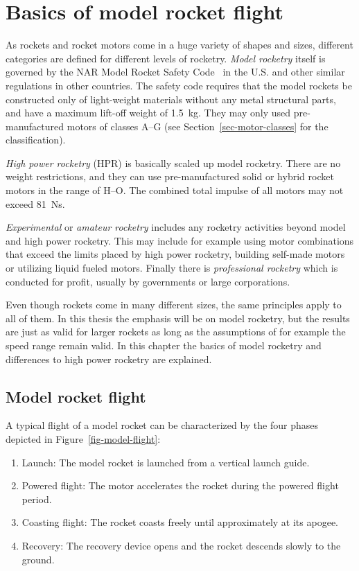 

\chapter{Basics of model rocket flight}
\label{chap-basics}


As rockets and rocket motors come in a huge variety of shapes and
sizes, different categories are defined for different levels of
rocketry.  {\it Model rocketry} itself is governed by the NAR Model
Rocket Safety Code~\cite{nar-safety-code} in the U.S. and other
similar regulations in other countries.  The safety code requires that
the model rockets be constructed only of light-weight materials
without any metal structural parts, and have a maximum lift-off weight
of 1.5~kg.  They may only used pre-manufactured motors of classes A--G
(see Section~\ref{sec-motor-classes} for the classification).

{\it High power rocketry} (HPR) is basically scaled up model
rocketry.  There are no weight restrictions, and they can use
pre-manufactured solid or hybrid rocket motors in the range of H--O.
The combined total impulse of all motors may not exceed 81~Ns.

{\it Experimental} or {\it amateur rocketry} includes any rocketry
activities beyond model and high power rocketry.  This may include
for example using motor combinations that exceed the limits placed by
high power rocketry, building self-made motors or utilizing liquid
fueled motors. Finally there is {\it professional rocketry} which is
conducted for profit, usually by governments or large corporations.

Even though rockets come in many different sizes, the same principles
apply to all of them.  In this thesis the emphasis will be on model
rocketry, but the results are just as valid for larger rockets as long
as the assumptions of for example the speed range remain valid.  In
this chapter the basics of model rocketry and differences to high
power rocketry are explained.


\section{Model rocket flight}

A typical flight of a model rocket can be characterized by the four
phases depicted in Figure~\ref{fig-model-flight}:
%
\begin{enumerate}
\item Launch:  The model rocket is launched from a vertical launch
  guide.
\item Powered flight:  The motor accelerates the rocket during the
  powered flight period.
\item Coasting flight:  The rocket coasts freely until approximately
  at its apogee.
\item Recovery:  The recovery device opens and the rocket descends
  slowly to the ground.
\end{enumerate}


